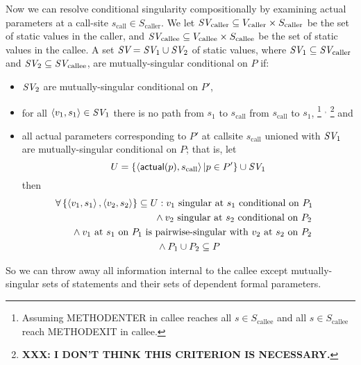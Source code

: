 \documentclass[11pt,notitlepage]{article}
\newcommand{\bigvar}[1]{\ensuremath{\text{\it #1}}}
\newcommand{\func}[1]{\ensuremath{\text{\sffamily #1}}}
\begin{document}
Now we can resolve conditional singularity compositionally by
examining actual parameters at a call-site $s_\text{call}\in S_\text{caller}$.
We let 
$\bigvar{SV}_\text{caller} \subseteq 
  V_\text{caller} \times S_\text{caller}$
be the set of static values in the caller, and
$\bigvar{SV}_\text{callee} \subseteq 
  V_\text{callee} \times S_\text{callee}$
be the set of static values in the callee.
A set $\bigvar{SV}=\bigvar{SV}_1 \cup \bigvar{SV}_2$ of static values,
where $\bigvar{SV}_1\subseteq \bigvar{SV}_\text{caller}$ and
      $\bigvar{SV}_2\subseteq \bigvar{SV}_\text{callee}$,
are mutually-singular conditional on $P$ if:
\begin{itemize}
\item $\bigvar{SV}_2$ are mutually-singular conditional on $P'$,
\item for all $\tuple{v_1,s_1}\in\bigvar{SV}_1$
there is no path from $s_1$ to $s_\text{call}$
             from $s_\text{call}$ to $s_1$,%
\footnote{Assuming METHOD\-ENTER in callee reaches all 
          $s\in S_\text{callee}$ and
          all $s\in S_\text{callee}$ reach METHOD\-EXIT in callee.}%
$^,$%
\footnote{\textbf{XXX: I DON'T THINK THIS CRITERION IS NECESSARY.}}
and
\item all actual parameters corresponding to $P'$ at callsite $s_\text{call}$
  unioned with $\bigvar{SV}_1$ are mutually-singular conditional on $P$;
  that is, let
\begin{displaymath}
U = 
\left\{\tuple{\func{actual}(p), s_\text{call}} | p \in P' \right\}
    \cup
\bigvar{SV}_1
\end{displaymath}
then
\begin{multline*}
\forall \left\{\tuple{v_1,s_1},\tuple{v_2,s_2}\right\} \subseteq U :
\hfill
v_1 \text{ singular at } s_1 \text{ conditional on } P_1
\mspace{-2mu}\quad\\\shoveright{{}\wedge
v_2 \text{ singular at } s_2 \text{ conditional on } P_2
}\\\shoveright{{}\wedge
v_1 \text{ at } s_1 \text{ on } P_1
\text{ is pairwise-singular with }
v_2 \text{ at } s_2 \text{ on } P_2
}\\{}\wedge
P_1 \cup P_2 \subseteq P
\end{multline*}
\end{itemize}

So we can throw away all information internal to the callee except
mutually-singular sets of statements and their sets of dependent
formal parameters.

\end{document}
